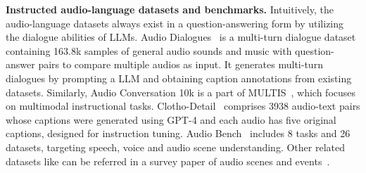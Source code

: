 \textbf{Instructed audio-language datasets and benchmarks.}
Intuitively, the audio-language datasets always exist in a question-answering form by utilizing the dialogue abilities of LLMs.
Audio Dialogues~\citep{goel2024audiodialogue} is a multi-turn dialogue dataset containing 163.8k samples of general audio sounds and music with question-answer pairs to compare multiple audios as input. It generates multi-turn dialogues by prompting a LLM and obtaining caption annotations from existing datasets. Similarly, Audio Conversation 10k is a part of MULTIS~\citep{zhao2023chatbridge}, which focuses on multimodal instructional tasks. Clotho-Detail~\citep{ghosal2023t2ageninstructionLLM} comprises 3938 audio-text pairs whose captions were generated using GPT-4 and each audio has five original captions, designed for instruction tuning. Audio Bench~\citep{wang2024audiobench} includes
8 tasks and 26 datasets, targeting speech, voice and audio scene understanding. Other related datasets like can be referred in a survey paper of audio scenes and events~\citep{wijngaard2025audiosurvey}.

